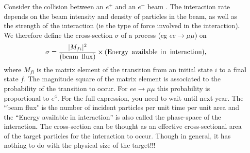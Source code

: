 Consider the collision between an $e^+$ and an $e^-$ beam . The interaction rate depends on the beam intensity and density of particles in the beam, as well as the strength of the interaction (ie the type of force involved in the interaction). We therefore define the cross-section 
$\sigma$ of a process (eg $ee\to\mu\mu$)  on 
\begin{equation}
\sigma=\frac{|M_{fi}|^2}{({\rm beam\,\,\,flux})}\times({\rm Energy\,\,\,available\,\,\,in\,\,\,interaction}),
\end{equation}
where $M_{fi}$ is the matrix element of the transition from an initial state $i$ to a final state $f$. The magnitude square of the matrix element is associated to the probability of the transition to occur. For $ee\to\mu\mu$ this probability is proportional to $e^4$. For the full expression, you need to wait until next year. The ``beam flux" is the number of incident particles per unit time per unit area and the ``Energy available in interaction'' is also called the phase-space of the interaction. The cross-section can be thought as an effective cross-sectional area of the target particles for the interaction to occur. Though in general, it has nothing to do with the physical size of the target!!!

